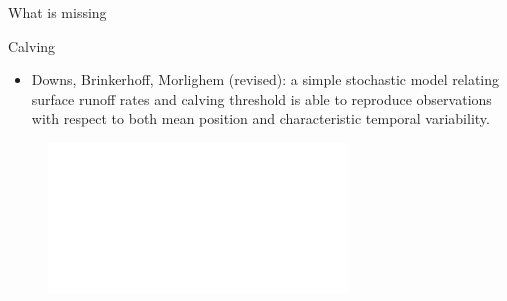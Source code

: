 \documentclass[hide notes,intlimits]{beamer}
\begin{document}
\begin{frame}{What is missing}
      \begin{minipage}[t][.9\textheight][t]{.9\textwidth}
  \begin{block}{Calving}
    \begin{itemize}
    \item Downs, Brinkerhoff, Morlighem (revised): 
a simple stochastic model relating surface runoff rates and calving threshold is able to reproduce observations with respect to both mean position and characteristic temporal variability.    \end{itemize}
      \begin{figure}
        \includegraphics<2->[width=.9\textwidth]{jib-runoff-1980-2020.pdf}
      \end{figure}
  \end{block}

      \end{minipage}
\end{frame}


  {
}

\begin{frame}[plain]
  \begin{figure}
\end{figure}
\end{frame}
\end{document}
